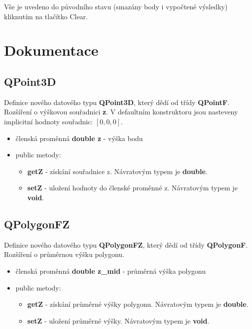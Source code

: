 \documentclass[a4paper, 12pt]{article}
\begin{document}
Vše je uvedeno do původního stavu (smazány body i vypočtené výsledky) kliknutím na tlačítko Clear.\\
\clearpage





\clearpage


\section {Dokumentace}

%
\subsection{QPoint3D}
Definice nového datového typu \textbf{QPoint3D}, který dědí od třídy \textbf{QPointF}. Rozšíření o výškovou souřadnici \textbf{z}. V defaultním konstruktoru jsou nasteveny implicitní hodnoty souřadnic: $[0,0,0]$.
\begin{itemize}
	\item členská proměnná \textbf{double z} - výška bodu
	\item public metody:
	\begin{itemize}
		\item \textbf{getZ} - získání souřadnice z. Návratovým typem je \textbf{double}. 
		\item \textbf{setZ} - uložení hodnoty do členské proměnné z. Návratovým typem je \textbf{void}. 
	\end{itemize}
\end{itemize}
\subsection{QPolygonFZ}
Definice nového datového typu \textbf{QPolygonFZ}, který dědí od třídy \textbf{QPolygonF}. Rozšíření o průměrnou výšku polygonu.
\begin{itemize}
	\item členská proměnná \textbf{double z\_mid} - průměrná výška polygonu
	\item public metody:
	\begin{itemize}
		\item \textbf{getZ} - získání průměrné výšky polygonu. Návratovým typem je \textbf{double}.
		\item \textbf{setZ} - uložení průměrné výšky. Návratovým typem je \textbf{void}.
	\end{itemize}
\end{itemize}
\end{document}
